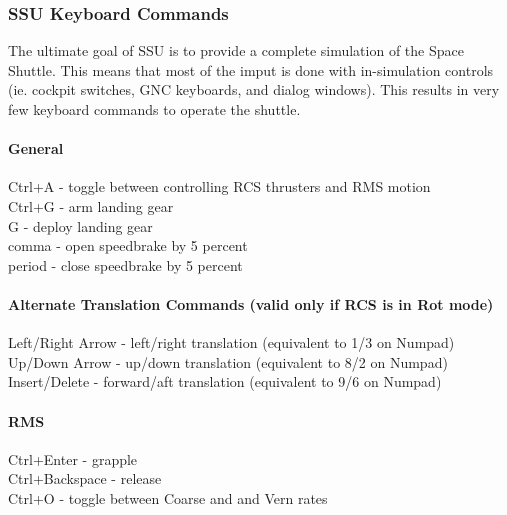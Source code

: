 \documentclass[13pt]{article}
\begin{document}
\subsubsection{\large SSU Keyboard Commands}
The ultimate goal of SSU is to provide a complete simulation of the Space Shuttle.  This means that most of the imput is done with in-simulation controls (ie. cockpit switches, GNC keyboards, and dialog windows). This results in very few keyboard commands to operate the shuttle.

\paragraph{General}
Ctrl+A - toggle between controlling RCS thrusters and RMS motion\\
Ctrl+G - arm landing gear\\
G - deploy landing gear\\
comma - open speedbrake by 5 percent\\
period - close speedbrake by 5 percent\\

\paragraph{Alternate Translation Commands (valid only if RCS is in Rot mode)}
Left/Right Arrow - left/right translation (equivalent to 1/3 on Numpad)\\
Up/Down Arrow - up/down translation (equivalent to 8/2 on Numpad)\\
Insert/Delete - forward/aft translation (equivalent to 9/6 on Numpad)\\

\paragraph{RMS}
Ctrl+Enter - grapple\\
Ctrl+Backspace - release\\
Ctrl+O - toggle between Coarse and and Vern rates\\
\end{document}
